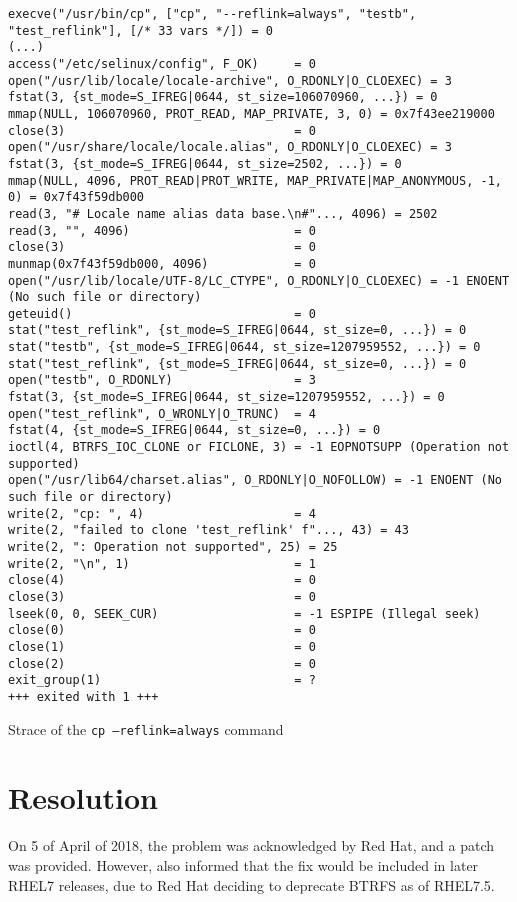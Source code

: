 \begin{listing}[h!]
\begin{verbatim}
execve("/usr/bin/cp", ["cp", "--reflink=always", "testb", "test_reflink"], [/* 33 vars */]) = 0
(...)
access("/etc/selinux/config", F_OK)     = 0
open("/usr/lib/locale/locale-archive", O_RDONLY|O_CLOEXEC) = 3
fstat(3, {st_mode=S_IFREG|0644, st_size=106070960, ...}) = 0
mmap(NULL, 106070960, PROT_READ, MAP_PRIVATE, 3, 0) = 0x7f43ee219000
close(3)                                = 0
open("/usr/share/locale/locale.alias", O_RDONLY|O_CLOEXEC) = 3
fstat(3, {st_mode=S_IFREG|0644, st_size=2502, ...}) = 0
mmap(NULL, 4096, PROT_READ|PROT_WRITE, MAP_PRIVATE|MAP_ANONYMOUS, -1, 0) = 0x7f43f59db000
read(3, "# Locale name alias data base.\n#"..., 4096) = 2502
read(3, "", 4096)                       = 0
close(3)                                = 0
munmap(0x7f43f59db000, 4096)            = 0
open("/usr/lib/locale/UTF-8/LC_CTYPE", O_RDONLY|O_CLOEXEC) = -1 ENOENT (No such file or directory)
geteuid()                               = 0
stat("test_reflink", {st_mode=S_IFREG|0644, st_size=0, ...}) = 0
stat("testb", {st_mode=S_IFREG|0644, st_size=1207959552, ...}) = 0
stat("test_reflink", {st_mode=S_IFREG|0644, st_size=0, ...}) = 0
open("testb", O_RDONLY)                 = 3
fstat(3, {st_mode=S_IFREG|0644, st_size=1207959552, ...}) = 0
open("test_reflink", O_WRONLY|O_TRUNC)  = 4
fstat(4, {st_mode=S_IFREG|0644, st_size=0, ...}) = 0
ioctl(4, BTRFS_IOC_CLONE or FICLONE, 3) = -1 EOPNOTSUPP (Operation not supported)
open("/usr/lib64/charset.alias", O_RDONLY|O_NOFOLLOW) = -1 ENOENT (No such file or directory)
write(2, "cp: ", 4)                     = 4
write(2, "failed to clone 'test_reflink' f"..., 43) = 43
write(2, ": Operation not supported", 25) = 25
write(2, "\n", 1)                       = 1
close(4)                                = 0
close(3)                                = 0
lseek(0, 0, SEEK_CUR)                   = -1 ESPIPE (Illegal seek)
close(0)                                = 0
close(1)                                = 0
close(2)                                = 0
exit_group(1)                           = ?
+++ exited with 1 +++
\end{verbatim}
\caption{Strace of the \texttt{cp --reflink=always} command}
\label{listing:icbd_nameserver}
\end{listing}


\section{Resolution}
\label{sec:resolution}
On 5 of April of 2018, the problem was acknowledged by Red Hat, and a patch was provided. However, also informed that the fix would be included in later RHEL7 releases, due to Red Hat deciding to deprecate BTRFS as of RHEL7.5.

